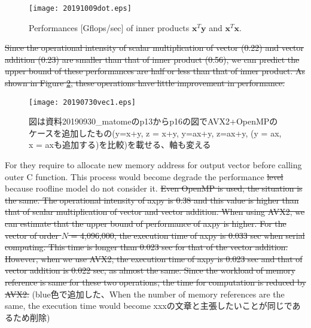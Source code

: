 \documentclass{IOS-Book-Article}
\begin{document}
{\begin{figure}[htbp]
  \begin{center}
    \texttt{[image: 20191009dot.eps]}
    \caption{Performances [Gflops/sec] of inner products $\bm{x}^T\bm{y}$ and $\bm{x}^T\bm{x}$.}
    \label{xdot}
  \end{center}
\end{figure}

\sout{Since the operational intensity of scalar multiplication of vector (0.22) and vector addition (0.23) are smaller than that of inner product (0.56), we can predict the upper bound of these performances are half or less than that of inner product. As shown in Figure \ref{xd}, these operations have little improvement in performance. }

\begin{figure}[htbp]
  \begin{center}
    \texttt{[image: 20190730vec1.eps]}
    \caption{図は資料20190930\_matomeのp13からp16の図でAVX2+OpenMPのケースを追加したもの(y=x+y, z = x+y, y=ax+y, z=ax+y, (y = ax, x = axも追加する)を比較)を載せる、軸も変える}
    \label{xd}
  \end{center}
\end{figure}

For {} they require to allocate new memory address for output vector before calling outer C function. This process would become degrade the performance \sout{level} because roofline model do not consider it.
{} {\color{mur}{within the same execution times.}} {}
\sout{Even OpenMP is used, the situation is the same. The operational intensity of axpy is 0.38 and this value is higher than that of scalar multiplication of vector and vector addition. When using AVX2, we can estimate that the upper bound of performance of axpy is higher. For the vector of order $N$ = 4,096,000, the execution time of axpy is 0.033 sec when serial computing. This time is longer than 0.023 sec for that of the vector addition. However, when we use AVX2, the execution time of axpy is 0.023 sec and that of vector addition is 0.022 sec, as almost the same. Since the workload of memory reference is same for these two operations, the time for computation is reduced by AVX2.} (blue色で追加した、When the number of memory references are the same, the execution time would become xxxの文章と主張したいことが同じであるため削除)



}
\end{document}
